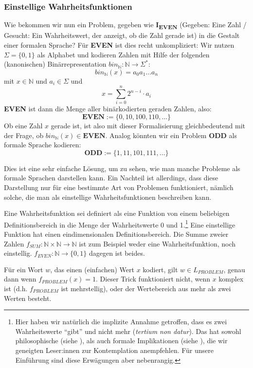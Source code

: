 \subsubsection{Einstellige Wahrheitsfunktionen}
Wie bekommen wir nun ein Problem, gegeben wie \textbf{I\textsubscript{EVEN}}
(Gegeben: Eine Zahl / Gesucht: Ein Wahrheitswert, der anzeigt, ob die Zahl gerade ist)
in die Gestalt einer formalen Sprache?
Für \textbf{EVEN} ist dies recht unkompliziert:
Wir nutzen $\Sigma = \{0,1\}$ als Alphabet
und kodieren Zahlen mit Hilfe der folgenden (kanonischen) Binärrepresentation
$bin_{\mathbb{N}}: \mathbb{N} \rightarrow \Sigma^*$:
\[
    bin_{\mathbb{N}}(x) = a_{0}a_{1} \ldots a_{n}
\]
mit $x \in \mathbb{N}$ und $a_i \in \Sigma$ und
\[
    x = \sum_{i=0}^n 2^{n-i} \cdot a_i
\]
\textbf{EVEN} ist dann die Menge aller binärkodierten geraden Zahlen, also:
\[
    \mathbf{EVEN} := \{0, 10, 100, 110, \ldots\}
\]
Ob eine Zahl $x$ gerade ist, ist also mit dieser Formalisierung gleichbedeutend mit der Frage,
ob $bin_{\mathbb{N}}(x) \in \mathbf{EVEN}$.
Analog könnten wir ein Problem \textbf{ODD} als formale Sprache kodieren:
\[
    \mathbf{ODD} := \{1, 11, 101, 111, \ldots \}
\]

Dies ist eine sehr einfache Lösung, um zu sehen,
wie man manche Probleme als formale Sprachen darstellen kann.
Ein Nachteil ist allerdings, dass diese Darstellung
nur für eine bestimmte Art von Problemen funktioniert,
nämlich solche, die man als einstellige Wahrheitsfunktionen beschreiben kann.


Eine Wahrheitsfunktion sei definiert als eine Funktion von einem beliebigen Definitionsbereich
in die Menge der Wahrheitswerte 0 und 1.\footnote{
    Hier haben wir natürlich die implizite Annahme getroffen,
    dass es zwei Wahrheitswerte ``gibt'' und nicht mehr (\emph{tertium non datur}).
    Das hat sowohl philosophische (siehe \cite{sep-logic-manyvalued}), als auch formale Implikationen (siehe \cite{gottwald}),
    die wir geneigten Leser:innen zur Kontemplation anempfehlen.
    Für unsere Einführung sind diese Erwägungen aber nebenrangig.
}
Eine einstellige Funktion hat einen eindimensionalen Definitionsbereich.
Die Summe zweier Zahlen $f_{SUM}: \mathbb{N} \times \mathbb{N} \rightarrow \mathbb{N}$
ist zum Beispiel weder eine Wahrheitsfunktion,
noch einstellig.
$f_{EVEN}: \mathbb{N} \rightarrow \{0,1\}$ dagegen ist beides.

Für ein Wort $w$, das einen (einfachen) Wert $x$ kodiert,
gilt $w \in L_{PROBLEM}$, genau dann wenn $f_{PROBLEM}(x) = 1$.
Dieser Trick funktioniert nicht,
wenn $x$ komplex ist (d.h. $f_{PROBLEM}$ ist mehrstellig),
oder der Wertebereich aus mehr als zwei Werten besteht.


